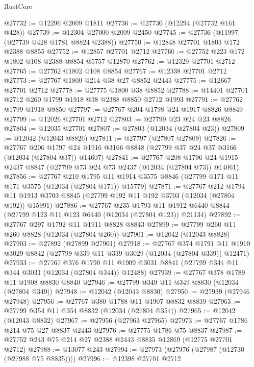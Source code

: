 \begin{lexlean}{RustCore}
\begin{coremodule}
@27732 := @12296 @2009 @1811
@27736 := @27730 (@12294 (@27732 @161 @428))
@27739 := @12304 @27000 @2009 @2450
@27745 := @27736 (@11997 (@27739 @428 @1781 @8824 @2388))
@27750 := @12848 @27701 @1803 @172 @2388 @8855
@27752 := @12857 @27701 @2712
@27760 := @27752 @223 @172 @1802 @108 @2388 @8854 @5757 @12870
@27762 := @12329 @27701 @2712
@27765 := @27762 @1802 @108 @8854
@27767 := @12338 @27701 @2712
@27773 := @27767 @1800 @214 @38 @27 @8852 @2443
@27775 := @12667 @27701 @2712
@27778 := @27775 @1800 @38 @8852
@27788 := @14401 @27701 @2712 @260 @1799 @1918 @38 @2388 @8850 @2712 @1993
@27791 := @27762 @1799 @1918 @8850
@27797 := @27767 @204 @1798 @24 @1917 @8826 @8849
@27799 := @12026 @27701 @2712
@27803 := @27799 @23 @24 @23 @8826
@27804 := @12035 @27701
@27807 := @27803 (@12034 (@27804 @23))
@27809 := @12042 (@12043 @8826)
@27811 := @27797 (@27807 @27809)
@27826 := @27767
    @206
    @1797
    @24
    @1916
    @3166
    @8848
    (@27799 @37 @24 @37 @3166 (@12034 (@27804 @37)) @14607)
@27841 := @27767
    @208
    @1796
    @24
    @1915
    @2437
    @8847
    (@27799 @73 @24 @73 @2437 (@12034 (@27804 @73)) @14061)
@27856 := @27767
    @210
    @1795
    @11
    @1914
    @3575
    @8846
    (@27799 @171 @11 @171 @3575 (@12034 (@27804 @171)) @15779)
@27871 := @27767
    @212
    @1794
    @11
    @1913
    @3703
    @8845
    (@27799 @192 @11 @192 @3703 (@12034 (@27804 @192)) @15991)
@27886 := @27767
    @235
    @1793
    @11
    @1912
    @6440
    @8844
    (@27799 @123 @11 @123 @6440 (@12034 (@27804 @123)) @21134)
@27892 := @27767 @297 @1792 @11 @1911 @8828 @8843
@27899 := @27799 @260 @11 @260 @8828 (@12034 (@27804 @260))
@27901 := @12042 (@12043 @8828)
@27903 := @27892 (@27899 @27901)
@27918 := @27767
    @374
    @1791
    @11
    @1910
    @3029
    @8842
    (@27799 @339 @11 @339 @3029 (@12034 (@27804 @339)) @12471)
@27933 := @27767
    @376
    @1790
    @11
    @1909
    @3031
    @8841
    (@27799 @344 @11 @344 @3031 (@12034 (@27804 @344)) @12488)
@27939 := @27767 @378 @1789 @11 @1908 @8830 @8840
@27946 := @27799 @349 @11 @349 @8830 (@12034 (@27804 @349))
@27948 := @12042 (@12043 @8830)
@27950 := @27939 (@27946 @27948)
@27956 := @27767 @380 @1788 @11 @1907 @8832 @8839
@27963 := @27799 @354 @11 @354 @8832 (@12034 (@27804 @354))
@27965 := @12042 (@12043 @8832)
@27967 := @27956 (@27963 @27965)
@27973 := @27767 @1786 @214 @75 @27 @8837 @2443
@27976 := @27775 @1786 @75 @8837
@27987 := @27752 @243 @75 @214 @27 @2388 @2443 @8835 @12869 (@12775 @27701 @2712)
@27988 := @13077 @243
@27994 := @27973 (@27976 (@27987 (@12730 (@27988 @75 @8835))))
@27996 := @12398 @27701 @2712

\end{coremodule}
\end{lexlean}
